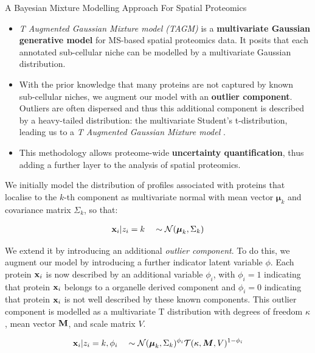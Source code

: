 \documentclass{beamer}
\theoremstyle{example}
\begin{document}
\begin{frame}{A Bayesian Mixture Modelling Approach For Spatial Proteomics}

  \begin{itemize}

    \item<+-> \textit{T Augmented Gaussian Mixture model (TAGM)} is a
      \textbf{multivariate Gaussian generative model} for MS-based
      spatial proteomics data. It posits that each annotated
      sub-cellular niche can be modelled by a multivariate Gaussian
      distribution.

    \item<+-> With the prior knowledge that many proteins are not
      captured by known sub-cellular niches, we augment our model with
      an \textbf{outlier component}. Outliers are often dispersed and
      thus this additional component is described by a heavy-tailed
      distribution: the multivariate Student's t-distribution, leading
      us to a \textit{T Augmented Gaussian Mixture model}
      \citep{Crook:2018,Crook:2019}.

    \item<+-> This methodology allows proteome-wide
      \textbf{uncertainty quantification}, thus adding a further layer
      to the analysis of spatial proteomics.

  \end{itemize}
\end{frame}


\begin{frame}{}

    We initially model the distribution of profiles associated with
    proteins that localise to the $k$-th component as multivariate
    normal with mean vector $\boldsymbol{\mu}_k$ and covariance matrix
    $\Sigma_k$, so that:

    \begin{align}
      {\bf x}_i | z_i = k \quad \sim \mathcal{N}(\boldsymbol{\mu}_k, \Sigma_k) \label{equation::preq}
    \end{align}

    \pause

    We extend it by introducing an additional \textit{outlier
      component}. To do this, we augment our model by introducing a
    further indicator latent variable $\phi$. Each protein ${\bf x}_i$
    is now described by an additional variable $\phi_i$, with $\phi_i
    = 1$ indicating that protein ${\bf x}_i$ belongs to a organelle
    derived component and $\phi_i = 0$ indicating that protein ${\bf
      x}_i$ is not well described by these known components. This
    outlier component is modelled as a multivariate T distribution
    with degrees of freedom $\kappa$, mean vector $\bf{M}$, and scale
    matrix $V$.

    \begin{align}
      {\bf x}_i | z_i = k, \phi_i \quad \sim \mathcal{N}(\boldsymbol{\mu}_k, \Sigma_k)^{\phi_i}\mathcal{T}(\kappa, \boldsymbol{M}, V)^{1 - \phi_i }
    \end{align}


\end{frame}
\end{document}
